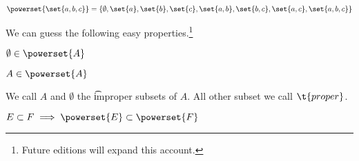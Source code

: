 
\begin{proposition}
  $\powerset{\set{a, b, c}} =
  \{
    \emptyset,
    \set{a},
    \set{b},
    \set{c},
    \set{a, b},
    \set{b, c},
    \set{a, c},
    \set{a, b, c}
  \}$
\end{proposition}


We can guess the following easy properties.\footnote{Future editions will expand this account.}

\begin{proposition}
  $\emptyset \in \powerset{A}$
\end{proposition}

\begin{proposition}
  $A \in \powerset{A}$
\end{proposition}

We call $A$ and $\emptyset$ the \t{improper} subsets of $A$.
All other subset we call $\t{proper}$.


\begin{proposition}
  $E \subset F \implies \powerset{E} \subset \powerset{F}$
\end{proposition}

